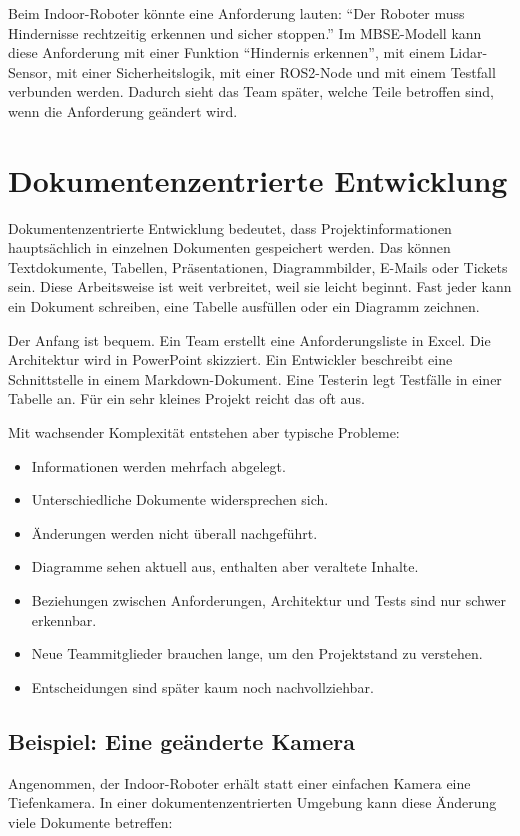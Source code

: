\begin{praxisbox}
Beim Indoor-Roboter könnte eine Anforderung lauten: \enquote{Der Roboter muss Hindernisse rechtzeitig erkennen und sicher stoppen.} Im MBSE-Modell kann diese Anforderung mit einer Funktion \enquote{Hindernis erkennen}, mit einem Lidar-Sensor, mit einer Sicherheitslogik, mit einer ROS2-Node und mit einem Testfall verbunden werden. Dadurch sieht das Team später, welche Teile betroffen sind, wenn die Anforderung geändert wird.
\end{praxisbox}

\section{Dokumentenzentrierte Entwicklung}
Dokumentenzentrierte Entwicklung bedeutet, dass Projektinformationen hauptsächlich in einzelnen Dokumenten gespeichert werden. Das können Textdokumente, Tabellen, Präsentationen, Diagrammbilder, E-Mails oder Tickets sein. Diese Arbeitsweise ist weit verbreitet, weil sie leicht beginnt. Fast jeder kann ein Dokument schreiben, eine Tabelle ausfüllen oder ein Diagramm zeichnen.

Der Anfang ist bequem. Ein Team erstellt eine Anforderungsliste in Excel. Die Architektur wird in PowerPoint skizziert. Ein Entwickler beschreibt eine Schnittstelle in einem Markdown-Dokument. Eine Testerin legt Testfälle in einer Tabelle an. Für ein sehr kleines Projekt reicht das oft aus.

Mit wachsender Komplexität entstehen aber typische Probleme:

\begin{itemize}
    \item Informationen werden mehrfach abgelegt.
    \item Unterschiedliche Dokumente widersprechen sich.
    \item Änderungen werden nicht überall nachgeführt.
    \item Diagramme sehen aktuell aus, enthalten aber veraltete Inhalte.
    \item Beziehungen zwischen Anforderungen, Architektur und Tests sind nur schwer erkennbar.
    \item Neue Teammitglieder brauchen lange, um den Projektstand zu verstehen.
    \item Entscheidungen sind später kaum noch nachvollziehbar.
\end{itemize}

\subsection{Beispiel: Eine geänderte Kamera}
Angenommen, der Indoor-Roboter erhält statt einer einfachen Kamera eine Tiefenkamera. In einer dokumentenzentrierten Umgebung kann diese Änderung viele Dokumente betreffen:

